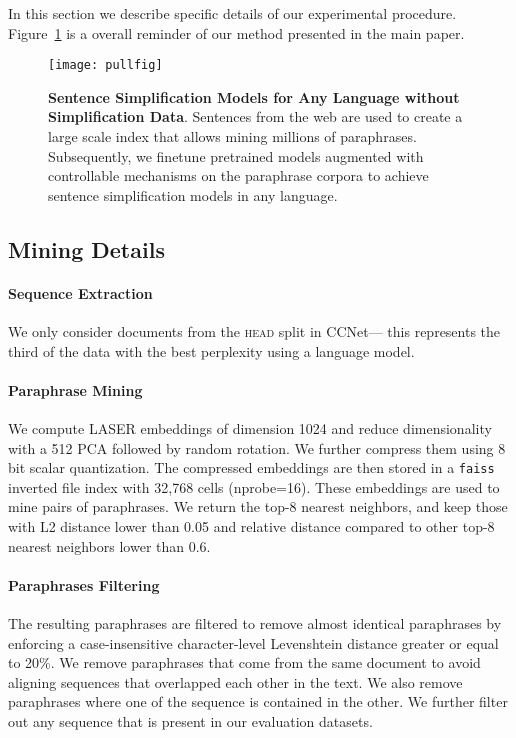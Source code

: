 \documentclass[11pt]{article}
\newcommand{\ccnet}{CCNet\xspace}
\newcommand{\laser}{LASER\xspace}
\begin{document}
In this section we describe specific details of our experimental procedure. Figure~\ref{fig:pullfig} is a overall reminder of our method presented in the main paper.


 \begin{figure}[!htbp]
     \centering
 \texttt{[image: pullfig]}
     \caption{\textbf{Sentence Simplification Models for Any Language without Simplification Data}. Sentences from the web are used to create a large scale index that allows mining millions of paraphrases. Subsequently, we finetune pretrained models augmented with controllable mechanisms on the paraphrase corpora to achieve sentence simplification models in any language.}
     \label{fig:pullfig}
 \end{figure}

\subsection{Mining Details} \label{sec:mining_details}


 \paragraph{Sequence Extraction} We only consider documents from the \textsc{head} split in \ccnet --- this represents the third of the data with the best perplexity using a  language model.


 
 \paragraph{Paraphrase Mining}
 We compute \laser embeddings of dimension 1024 and reduce  dimensionality with a 512 PCA followed by random rotation. We further compress them using 8 bit scalar quantization. The compressed embeddings are then stored in a \texttt{faiss} inverted file index with 32,768 cells (nprobe=16). These embeddings are used to mine pairs of paraphrases.
 We return the top-8 nearest neighbors, and keep those with L2 distance lower than 0.05 and relative distance compared to other top-8 nearest neighbors lower than 0.6.
 
 \paragraph{Paraphrases Filtering}
 The resulting paraphrases are filtered to remove almost identical paraphrases by enforcing a case-insensitive character-level Levenshtein distance \cite{levenshtein1966binary} greater or equal to 20\%. We remove paraphrases that come from the same document to avoid aligning sequences that overlapped each other in the  text. We also remove paraphrases where one of the sequence is contained in the other.
 We further filter out any sequence that is present in our evaluation datasets.
\end{document}
